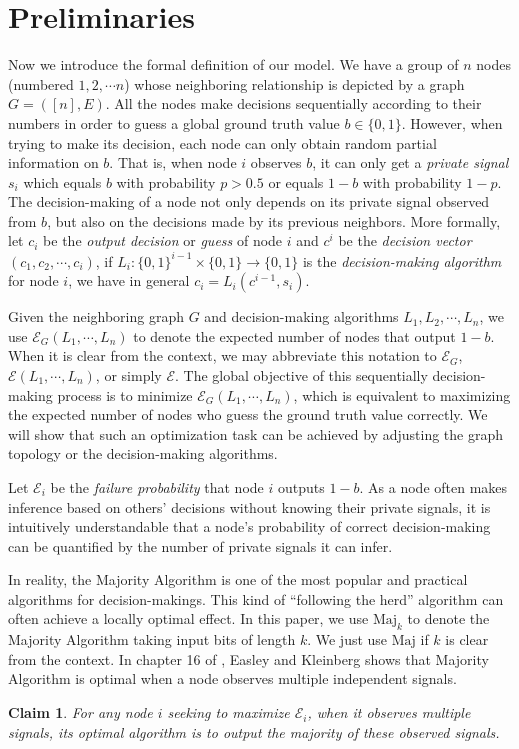 \documentclass[a4paper,UKenglish]{lipics}
\newtheorem{clm}[thm]{Claim}
\theoremstyle{definition}
\newcommand{\Maj}{\text{Maj}}
\begin{document}
\section{Preliminaries}\label{sec:prel}

Now we introduce the formal definition of our model. 
We have a group of $n$ nodes (numbered $1,2,\cdots n$) whose neighboring relationship is depicted by a graph $G = ([n],E)$. 
All the nodes make decisions sequentially according to their numbers in order to guess a global ground truth value $b\in\{0,1\}$. 
However, when trying to make its decision, each node can only obtain random partial information on $b$. 
That is, when node $i$ observes $b$, 
	it can only get a \emph{private signal} $s_i$ which equals $b$ with probability $p>0.5$ or equals $1-b$ with probability $1-p$.  
The decision-making of a node not only depends on its private signal observed from $b$, 
	but also on the decisions made by its previous neighbors. 
More formally, let $c_i$ be the \emph{output decision} or \emph{guess} of node $i$ and $c^i$ be the \emph{decision vector} $(c_1, c_2, \cdots, c_i)$, 
	if $ L_i : \{0,1\}^{i-1}\times \{0,1\} \to \{0,1\} $ is the \emph{decision-making algorithm} for node $i$,  we have in general $c_i = L_i(c^{i-1}, s_i)$.

Given the neighboring graph $G$ and decision-making algorithms $L_1, L_2, \cdots, L_n$, 
	we use $\mathcal{E}_G(L_1, \dotsb, L_n)$ to denote the expected number of nodes that output $1 - b$. 
When it is clear from the context, we may abbreviate this notation to $\mathcal{E}_G$,
	$\mathcal{E}(L_1, \dotsb, L_n)$, or simply $\mathcal{E}$. 
The global objective of this sequentially decision-making process is to minimize $\mathcal{E}_G(L_1, \dotsb, L_n)$, 
	which is equivalent to maximizing the expected number of nodes who guess the ground truth value correctly. 
We will show that such an optimization task can be achieved by adjusting the graph topology or the decision-making algorithms. 

Let $\mathcal{E}_i$ be the \emph{failure probability} that node $i$ outputs $1 - b$. 
As a node often makes inference based on others' decisions without knowing their private signals, 
	it is intuitively understandable that a node's probability of correct decision-making can be quantified by the number of private signals it can infer.

In reality, the Majority Algorithm is one of the most popular and practical algorithms for decision-makings. 
This kind of ``following the herd'' algorithm can often achieve a locally optimal effect. In this paper, we use $\Maj_k$ to denote the Majority Algorithm taking input bits of length $k$. We just use $\Maj$ if $k$ is clear from the context.
In chapter 16 of \cite{easley2010networks}, Easley and Kleinberg shows that Majority Algorithm is optimal when a node observes multiple independent signals.
\begin{clm}
	\label{clm:multiple is optimal}
	For any node $i$ seeking to maximize $\mathcal{E}_i$, 
		when it observes multiple signals, its optimal algorithm is to output the majority of these observed signals.
\end{clm}
\end{document}
